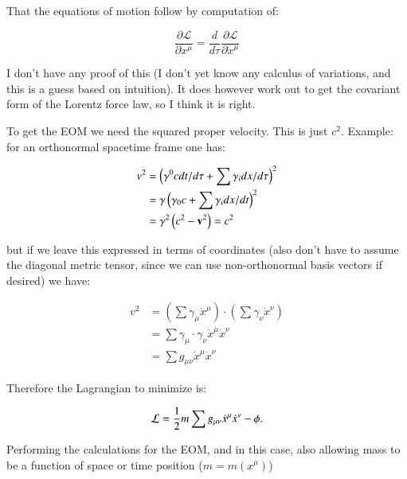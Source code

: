 \documentclass{article}      %
\newcommand{\LL}[0]{\mathcal{L}}
\newcommand{\PD}[2]{\frac{\partial {#2}}{\partial {#1}}}
\newcommand{\xdot}[0]{\dot{x}}
\begin{document}
That the equations of motion follow by computation of:

\begin{equation*}
\PD{x^{\mu}}{\LL} = \frac{d}{d\tau} \PD{\xdot^{\mu}}{\LL}
\end{equation*}

I don't have any proof of this (I don't yet know any calculus of variations, and this is a guess based on intuition).  It does however work out to get the covariant form of the Lorentz force law, so I think it is right.

To get the EOM we need the squared proper velocity.  This is just $c^2$.  Example: for an orthonormal spacetime frame one has:

\begin{align*}
v^2 &= 
\left(\gamma^0 c dt/d\tau + \sum \gamma_i dx/d\tau\right)^2  \\
&= \gamma \left(\gamma_0 c + \sum \gamma_i dx/dt\right)^2 \\
&= \gamma^2 \left(c^2 - \mathbf{v}^2\right) = c^2
\end{align*}

but if we leave this expressed in terms of coordinates (also don't have to assume the diagonal metric tensor, since we can use non-orthonormal basis vectors if desired) we have:

\begin{align*}
v^2 
&= \left(\sum \gamma_{\mu} \xdot^{\mu}\right) \cdot \left(\sum \gamma_{\nu} \xdot^{\nu}\right) \\
&= \sum \gamma_{\mu} \cdot \gamma_{\nu} \xdot^{\mu} \xdot^{\nu} \\
&= \sum g_{\mu\nu} \xdot^{\mu} \xdot^{\nu}
\end{align*}

Therefore the Lagrangian to minimize is:

\begin{equation*}
\LL = \inv{2} m \sum g_{\mu\nu} \xdot^{\mu} \xdot^{\nu} - \phi.
\end{equation*}

Performing the calculations for the EOM, and in this case, also allowing mass to be a function of space or time position ($m = m(x^{\mu})$)
\end{document}
